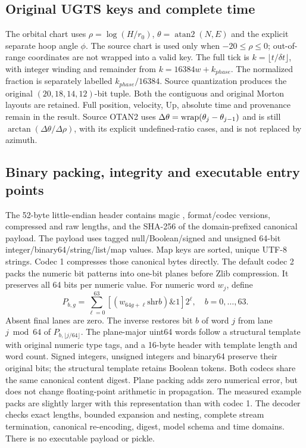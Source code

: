 \subsection{Original UGTS keys and complete time}
The orbital chart uses $\rho=\log(H/r_0)$, $\theta=\operatorname{atan2}(N,E)$ and
the explicit separate hoop angle $\phi$. The source chart is used only when
$-20\le\rho\le0$; out-of-range coordinates are not wrapped into a valid key.
The full tick is $k=\lfloor t/\delta t\rfloor$, with integer winding and remainder
from $k=16384w+k_{phase}$. The normalized fraction is separately labelled
$k_{phase}/16384$. Source quantization produces the original
$(20,18,14,12)$-bit tuple. Both the contiguous and original Morton layouts are
retained. Full position, velocity, Up, absolute time and provenance remain in
the result. Source OTAN2 uses $\Delta\theta=\operatorname{wrap}(\theta_j-\theta_{j-1})$ and is
still $\arctan(\Delta\theta/\Delta\rho)$, with its
explicit undefined-ratio cases, and is not replaced by azimuth.

\subsection{Binary packing, integrity and executable entry points}
The 52-byte little-endian header contains magic , format/codec
versions, compressed and raw lengths, and the SHA-256 of the domain-prefixed
canonical payload. The payload uses tagged null/Boolean/signed and unsigned
64-bit integer/binary64/string/list/map values. Map keys are sorted, unique UTF-8
strings. Codec 1 compresses those canonical bytes directly. The default codec 2
packs the numeric bit patterns into one-bit planes before Zlib compression.
It preserves all 64 bits per numeric value. For numeric word $w_j$, define
\begin{equation}
P_{b,g}=\sum_{\ell=0}^{63}
\left[\left(w_{64g+\ell}\mathbin{\mathrm{shr}}b\right)\mathbin\&1\right]2^\ell,
\quad b=0,\ldots,63.
\end{equation}
Absent final lanes are zero. The inverse restores bit $b$ of word $j$ from
lane $j\bmod64$ of $P_{b,\lfloor j/64\rfloor}$.
The plane-major uint64 words follow a structural template with original numeric
type tags, and a 16-byte  header with template length and word count.
Signed integers, unsigned integers and binary64 preserve their original bits;
the structural template retains Boolean tokens. Both codecs share the same
canonical content digest. Plane packing adds zero numerical error, but does not
change floating-point arithmetic in propagation. The measured example packs are
slightly larger with this representation than with codec 1.
The decoder checks exact lengths,
bounded expansion and nesting, complete stream termination, canonical re-encoding,
digest, model schema and time domains. There is no executable payload or pickle.

